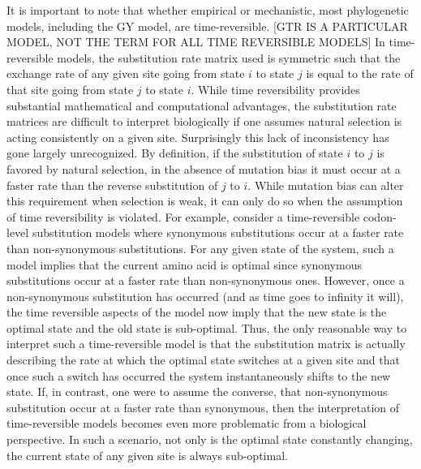 \documentclass[13pt]{article}
\begin{document}
It is important to note that whether empirical or mechanistic, most phylogenetic models, including the GY model, are time-reversible. [GTR IS A PARTICULAR MODEL, NOT THE TERM FOR ALL TIME REVERSIBLE MODELS]
In time-reversible models, the substitution rate matrix used is symmetric such that the exchange rate of any given site going from state $i$ to state $j$ is equal to the rate of that site going from state $j$ to state $i$.
While time reversibility provides substantial mathematical and computational advantages, the substitution rate matrices are difficult to interpret biologically if one assumes natural selection is acting consistently on a given site.
Surprisingly this lack of inconsistency has gone largely unrecognized.
By definition, if the substitution of state $i$ to $j$ is favored by natural selection, in the absence of mutation bias it must occur at a faster rate than the reverse substitution of $j$ to $i$.
While mutation bias can alter this requirement when selection is weak, it can only do so when the assumption of time reversibility is violated.
For example, consider a time-reversible codon-level substitution models where synonymous substitutions occur at a faster rate than non-synonymous substitutions.
For any given state of the system, such a model implies that the current amino acid is optimal since synonymous substitutions occur at a faster rate than non-synonymous ones.
However, once a non-synonymous substitution has occurred (and as time goes to infinity it will),  the time reversible aspects of the model now imply that the new state is the optimal state and the old state is sub-optimal.
Thus, the only reasonable way to interpret such a time-reversible model is that the substitution matrix is actually describing the rate at which the optimal state switches at a given site and that once such a switch has occurred the system instantaneously shifts to the new state.
If, in contrast, one were to assume the converse, that non-synonymous substitution occur at a faster rate than synonymous, then the interpretation of time-reversible models becomes even more problematic from a biological perspective.
In such a scenario, not only is the optimal state constantly changing, the current state of any given site is always sub-optimal.
\end{document}
